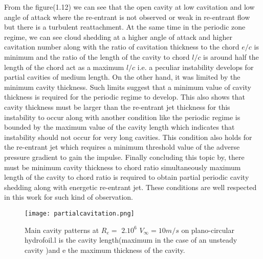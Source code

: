  From the figure(1.12) we can see that the open cavity at low cavitation and low angle of attack where the re-entrant is not observed or weak in re-entrant flow but there is a turbulent reattachment. At the
same time in the periodic zone regime, we can see cloud shedding at a higher angle of attack and higher cavitation number along with the ratio of cavitation thickness to the chord $e/c$ is minimum and 
the ratio of the length of the cavity to chord $l/c$ is around half the length of the chord act as a maximum $l/c$ i.e. a peculiar instability develops for partial cavities of medium length. On the other hand, it was limited 
by the minimum cavity thickness. Such limits suggest that a minimum value of cavity thickness is required for the periodic regime to develop. This also shows that cavity thickness must 
be larger than the re-entrant jet thickness for this instability to occur along with another condition like the periodic regime is bounded by the maximum value of the cavity length which indicates that instability 
should not occur for very long cavities. This condition also holds for the re-entrant jet which requires a minimum threshold value of the adverse pressure gradient to gain the impulse. Finally concluding this topic by, 
there must be minimum cavity thickness to chord ratio simultaneously maximum length of the cavity to chord ratio is required to obtain partial periodic cavity shedding along with energetic re-entrant jet. These conditions are 
well respected in this work for such kind of observation.\\
\begin{figure}[H]
 \centering
 \texttt{[image: partialcavitation.png]}
 \caption{Main cavity patterns at $R_e =$ $2.{10}^6$ ${V_{\infty}} =10{m}/{s}$ on plano-circular hydrofoil.l is the cavity length(maximum in the case of an unsteady cavity )and e the maximum thickness of the cavity.\\}
  \label{fig:fig12}
\end{figure}

